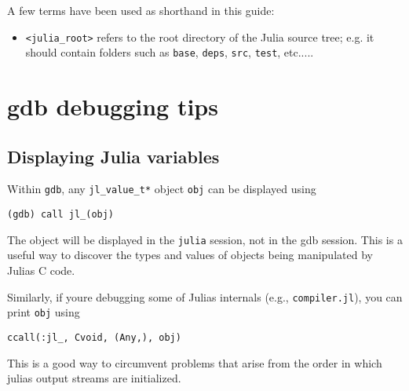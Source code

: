 A few terms have been used as shorthand in this guide:



\begin{itemize}
\item \texttt{<julia\_root>} refers to the root directory of the Julia source tree; e.g. it should contain folders such as \texttt{base}, \texttt{deps}, \texttt{src}, \texttt{test}, etc.....

\end{itemize}


\hypertarget{9363494011247086183}{}


\section{gdb debugging tips}



\hypertarget{7470105576182008459}{}


\subsection{Displaying Julia variables}



Within \texttt{gdb}, any \texttt{jl\_value\_t*} object \texttt{obj} can be displayed using




\begin{lstlisting}
(gdb) call jl_(obj)
\end{lstlisting}



The object will be displayed in the \texttt{julia} session, not in the gdb session. This is a useful way to discover the types and values of objects being manipulated by Julia{\textquotesingle}s C code.



Similarly, if you{\textquotesingle}re debugging some of Julia{\textquotesingle}s internals (e.g., \texttt{compiler.jl}), you can print \texttt{obj} using




\begin{verbatim}
ccall(:jl_, Cvoid, (Any,), obj)
\end{verbatim}



This is a good way to circumvent problems that arise from the order in which julia{\textquotesingle}s output streams are initialized.



